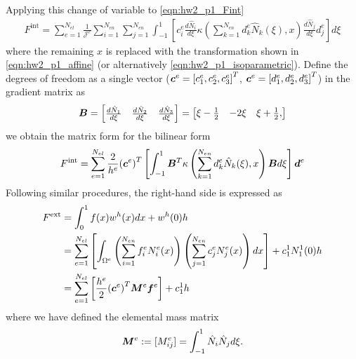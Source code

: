 Applying this change of variable to \cref{eqn:hw2_p1_Fint}
\begin{equation}
\begin{aligned}
    F^{\textrm{int}} = \sum_{e=1}^{N_{el}} \frac{1}{\mathcal{J}^e} \sum_{i=1}^{N_{en}}\sum_{j=1}^{N_{en}} 
    \int_{-1}^{1} \left[ c_i^e \frac{d\hat{N}_i}{d\xi} \kappa\left(\sum_{k=1}^{N_{en}} d_k^e \hat{N}_k(\xi), x\right) \frac{d\hat{N}_j}{d\xi} d_j^e \right] d\xi 
\end{aligned}
\end{equation}
where the remaining $x$ is replaced with the transformation shown in \cref{eqn:hw2_p1_affine} (or alternatively \cref{eqn:hw2_p1_isoparametric}).
Define the degrees of freedom as a single vector ($\bm{c}^e = {[c_1^e, c_2^e, c_3^e]}^T$, $\bm{c}^e = {[d_1^e, d_2^e, d_3^e]}^T$) in the gradient matrix as 
\begin{equation}\label{eqn:hw2_p1_gradient_matrix}
    \bm{B} = \begin{bmatrix}
        \frac{d\hat{N}_1}{d\xi} & \frac{d\hat{N}_2}{d\xi} & \frac{d\hat{N}_3}{d\xi}
    \end{bmatrix} = \begin{bmatrix}
        \xi - \frac{1}{2} & -2\xi & \xi + \frac{1}{2},
    \end{bmatrix}
\end{equation}
we obtain the matrix form for the bilinear form 
\begin{equation}
    F^{\textrm{int}} = \sum_{e=1}^{N_{el}} \frac{2}{h^e} {(\bm{c}^e)}^T
    \left[ \int_{-1}^{1} \bm{B}^T \kappa\left(\sum_{k=1}^{N_{en}} d_k^e \hat{N}_k(\xi), x\right) \bm{B} d\xi \right] \bm{d}^e
\end{equation}
Following similar procedures, the right-hand side is expressed as  
\begin{equation}
\begin{aligned}
    F^{\textrm{ext}} &= \int_0^1 f(x) w^h(x) dx + w^h(0) h \\
    &= \sum_{e=1}^{N_{el}} \left[ \int_{\Omega^e} \left(\sum_{i=1}^{N_{en}}f_i^e N_i^e(x) \right) \left(\sum_{j=1}^{N_{en}}c_j^e N_j^e(x) \right) dx \right] + c_1^1 N_1^1(0) h \\
    &= \sum_{e=1}^{N_{el}} \left[\frac{h^e}{2} {\left(\bm{c}^e\right)}^T \bm{M}^e \bm{f}^e  \right] + c_1^1 h
\end{aligned}
\end{equation}
where we have defined the elemental mass matrix 
\begin{equation}\label{eqn:hw2_p1_mass_matrix}
    \bm{M}^e := [M_{ij}^e] = \int_{-1}^1 \hat{N}_i \hat{N}_j d\xi.
\end{equation}
